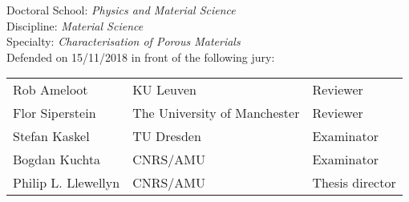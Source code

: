 \begin{titlepage}
\begin{flushleft}
	\vspace{0.2cm}
	\normalsize 
	Doctoral School: \textit{Physics and Material Science}\\
    Discipline: \textit{Material Science}\\
    Specialty: \textit{Characterisation of Porous Materials}\\
	\vspace{0.5cm}
    \normalsize Defended on 15/11/2018 in front of the following jury:\\
\end{flushleft}
\vspace{0.3cm}
\begin{tabular}{lll}
	Rob Ameloot & KU Leuven & Reviewer \\
    \vspace{0.08cm}
	Flor Siperstein & The University of Manchester & Reviewer \\
    \vspace{0.08cm}
	Stefan Kaskel & TU Dresden & Examinator \\
    \vspace{0.08cm}
	Bogdan Kuchta & CNRS/AMU & Examinator \\
    \vspace{0.08cm}
	Philip L. Llewellyn & CNRS/AMU & Thesis director \\
\end{tabular}

\end{titlepage}